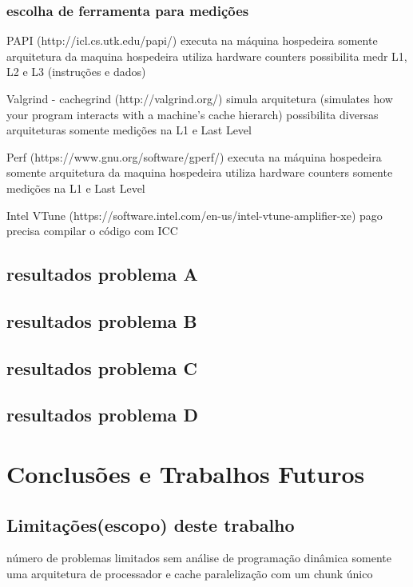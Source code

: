         \subsection{escolha de ferramenta para medições}
            PAPI (http://icl.cs.utk.edu/papi/)
                executa na máquina hospedeira
                somente arquitetura da maquina hospedeira
                utiliza hardware counters
                possibilita medr L1, L2 e L3 (instruções e dados)
                
            Valgrind - cachegrind (http://valgrind.org/)
                simula arquitetura (simulates how your program interacts with a machine's cache hierarch)
                possibilita diversas arquiteturas
                somente medições na L1 e Last Level
                
            Perf (https://www.gnu.org/software/gperf/)
                executa na máquina hospedeira
                somente arquitetura da maquina hospedeira
                utiliza hardware counters
                somente medições na L1 e Last Level
                
            Intel VTune (https://software.intel.com/en-us/intel-vtune-amplifier-xe)
                pago
                precisa compilar o código com ICC
    
    \section{resultados problema A}
    \section{resultados problema B}
    \section{resultados problema C}
    \section{resultados problema D}

\chapter{Conclusões e Trabalhos Futuros}




    \section{Limitações(escopo) deste trabalho}
        número de problemas limitados
        sem análise de programação dinâmica
        somente uma arquitetura de processador e cache
        paralelização com um chunk único